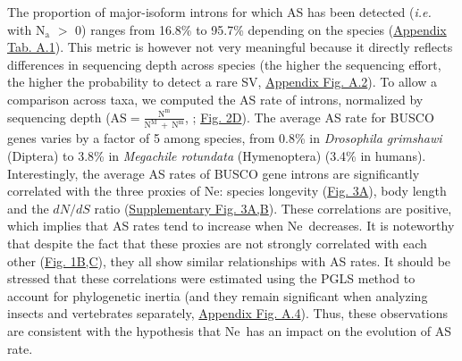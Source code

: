 The proportion of major-isoform introns for which AS has been detected (\textit{i.e.} with $\mathrm{N_a}$ $>$ 0) ranges from 16.8\% to 95.7\% depending on the species (\hyperref[table:1]{Appendix Tab. A.1}). This metric is however not very meaningful because it directly reflects differences in sequencing depth across species (the higher the sequencing effort, the higher the probability to detect a rare \acrshort{SV}, \hyperref[supp_fig:AS2]{Appendix Fig. A.2}). To allow a comparison across taxa, we computed the AS rate of introns, normalized by sequencing depth ($\mathrm{AS=\frac{N^m}{N^M~+~N^m}}$, ; \hyperref[fig:AS2]{Fig. 2D}). The average AS rate for \acrshort{BUSCO} genes varies by a factor of 5 among species, from 0.8\% in \textit{Drosophila grimshawi} (Diptera) to 3.8\% in \textit{Megachile rotundata} (Hymenoptera) (3.4\% in humans). Interestingly, the average AS rates of \acrshort{BUSCO} gene introns are significantly correlated with the three proxies of \acrshort{Ne}: species longevity (\hyperref[fig:AS3]{Fig. 3A}), body length and the ${dN}/{dS}$ ratio (\hyperref[supp_fig:AS3]{Supplementary Fig. 3A,B}). These correlations are positive, which implies that AS rates tend to increase when \acrshort{Ne}~decreases. It is noteworthy that despite the fact that these proxies are not strongly correlated with each other (\hyperref[fig:AS1]{Fig. 1B,C}), they all show similar relationships with AS rates. It should be stressed that these correlations were estimated using the PGLS method to account for phylogenetic inertia (and they remain significant when analyzing insects and vertebrates separately, \hyperref[supp_fig:AS4]{Appendix Fig. A.4}). Thus, these observations are consistent with the hypothesis that \acrshort{Ne}~has an impact on the evolution of AS rate.


